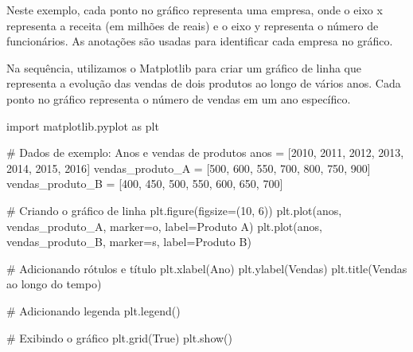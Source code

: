 \documentclass[
  portuguese,
  letterpaper,
  DIV=11,
  numbers=noendperiod]{scrreprt}
\newenvironment{Shaded}{\begin{snugshade}}{\end{snugshade}}
\newcommand{\CommentTok}[1]{\textcolor[rgb]{0.37,0.37,0.37}{#1}}
\newcommand{\DecValTok}[1]{\textcolor[rgb]{0.68,0.00,0.00}{#1}}
\newcommand{\ImportTok}[1]{\textcolor[rgb]{0.00,0.46,0.62}{#1}}
\newcommand{\NormalTok}[1]{\textcolor[rgb]{0.00,0.23,0.31}{#1}}
\newcommand{\OperatorTok}[1]{\textcolor[rgb]{0.37,0.37,0.37}{#1}}
\newcommand{\StringTok}[1]{\textcolor[rgb]{0.13,0.47,0.30}{#1}}
\newcommand{\VariableTok}[1]{\textcolor[rgb]{0.07,0.07,0.07}{#1}}
\theoremstyle{definition}
\theoremstyle{remark}
\begin{document}
Neste exemplo, cada ponto no gráfico representa uma empresa, onde o eixo
x representa a receita (em milhões de reais) e o eixo y representa o
número de funcionários. As anotações são usadas para identificar cada
empresa no gráfico.

Na sequência, utilizamos o Matplotlib para criar um gráfico de linha que
representa a evolução das vendas de dois produtos ao longo de vários
anos. Cada ponto no gráfico representa o número de vendas em um ano
específico.

\begin{Shaded}
\begin{Highlighting}[]
\ImportTok{import}\NormalTok{ matplotlib.pyplot }\ImportTok{as}\NormalTok{ plt}

\CommentTok{\# Dados de exemplo: Anos e vendas de produtos}
\NormalTok{anos }\OperatorTok{=}\NormalTok{ [}\DecValTok{2010}\NormalTok{, }\DecValTok{2011}\NormalTok{, }\DecValTok{2012}\NormalTok{, }\DecValTok{2013}\NormalTok{, }\DecValTok{2014}\NormalTok{, }\DecValTok{2015}\NormalTok{, }\DecValTok{2016}\NormalTok{]}
\NormalTok{vendas\_produto\_A }\OperatorTok{=}\NormalTok{ [}\DecValTok{500}\NormalTok{, }\DecValTok{600}\NormalTok{, }\DecValTok{550}\NormalTok{, }\DecValTok{700}\NormalTok{, }\DecValTok{800}\NormalTok{, }\DecValTok{750}\NormalTok{, }\DecValTok{900}\NormalTok{]}
\NormalTok{vendas\_produto\_B }\OperatorTok{=}\NormalTok{ [}\DecValTok{400}\NormalTok{, }\DecValTok{450}\NormalTok{, }\DecValTok{500}\NormalTok{, }\DecValTok{550}\NormalTok{, }\DecValTok{600}\NormalTok{, }\DecValTok{650}\NormalTok{, }\DecValTok{700}\NormalTok{]}

\CommentTok{\# Criando o gráfico de linha}
\NormalTok{plt.figure(figsize}\OperatorTok{=}\NormalTok{(}\DecValTok{10}\NormalTok{, }\DecValTok{6}\NormalTok{))}
\NormalTok{plt.plot(anos, vendas\_produto\_A, marker}\OperatorTok{=}\StringTok{\textquotesingle{}o\textquotesingle{}}\NormalTok{, label}\OperatorTok{=}\StringTok{\textquotesingle{}Produto A\textquotesingle{}}\NormalTok{)}
\NormalTok{plt.plot(anos, vendas\_produto\_B, marker}\OperatorTok{=}\StringTok{\textquotesingle{}s\textquotesingle{}}\NormalTok{, label}\OperatorTok{=}\StringTok{\textquotesingle{}Produto B\textquotesingle{}}\NormalTok{)}

\CommentTok{\# Adicionando rótulos e título}
\NormalTok{plt.xlabel(}\StringTok{\textquotesingle{}Ano\textquotesingle{}}\NormalTok{)}
\NormalTok{plt.ylabel(}\StringTok{\textquotesingle{}Vendas\textquotesingle{}}\NormalTok{)}
\NormalTok{plt.title(}\StringTok{\textquotesingle{}Vendas ao longo do tempo\textquotesingle{}}\NormalTok{)}

\CommentTok{\# Adicionando legenda}
\NormalTok{plt.legend()}

\CommentTok{\# Exibindo o gráfico}
\NormalTok{plt.grid(}\VariableTok{True}\NormalTok{)}
\NormalTok{plt.show()}
\end{Highlighting}
\end{Shaded}
\end{document}

